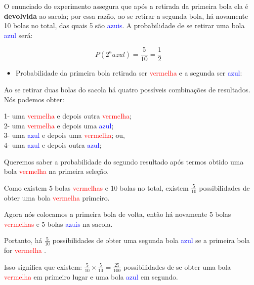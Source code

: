 \documentclass[
]{book}
\providecommand{\tightlist}{%
  \setlength{\itemsep}{0pt}\setlength{\parskip}{0pt}}
\begin{document}
O enunciado do experimento assegura que após a retirada da primeira bola ela é \textbf{devolvida} ao sacola; por essa razão, ao se retirar a segunda bola, há novamente 10 bolas no total, das quais 5 são \textcolor{blue}{azuis}. A probabilidade de se retirar uma bola \textcolor{blue}{azul} será:

\hfill\break

\[
P(2^{a} azul)= \frac{5}{10}= \frac{1}{2}
\]

\hfill\break

\begin{itemize}
\tightlist
\item
  Probabilidade da primeira bola retirada ser \textcolor{red}{vermelha} e a segunda ser \textcolor{blue}{azul}:
\end{itemize}

\hfill\break

Ao se retirar duas bolas do sacola há quatro possíveis combinações de resultados. Nós podemos obter:

\hfill\break

1- uma \textcolor{red}{vermelha} e depois outra \textcolor{red}{vermelha};\\
2- uma \textcolor{red}{vermelha} e depois uma \textcolor{blue}{azul};\\
3- uma \textcolor{blue}{azul} e depois uma \textcolor{red}{vermelha}; ou,\\
4- uma \textcolor{blue}{azul} e depois outra \textcolor{blue}{azul};

\hfill\break

Queremos saber a probabilidade do segundo resultado após termos obtido uma bola \textcolor{red}{vermelha} na primeira seleção.

\hfill\break

Como existem 5 bolas \textcolor{red}{vermelhas} e 10 bolas no total, existem \(\frac{5}{10}\) possibilidades de obter uma bola \textcolor{red}{vermelha} primeiro.

\hfill\break

Agora nós colocamos a primeira bola de volta, então há novamente 5 bolas \textcolor{red}{vermelhas} e 5 bolas \textcolor{blue}{azuis} na sacola.

\hfill\break

Portanto, há \(\frac{5}{10}\) possibilidades de obter uma segunda bola \textcolor{blue}{azul} se a primeira bola for \textcolor{red}{vermelha} .

\hfill\break

Isso significa que existem: \(\frac{5}{10} \times \frac{5}{10}= \frac{25}{100}\) possibilidades de se obter uma bola \textcolor{red}{vermelha} em primeiro lugar e uma bola \textcolor{blue}{azul} em segundo.
\end{document}
